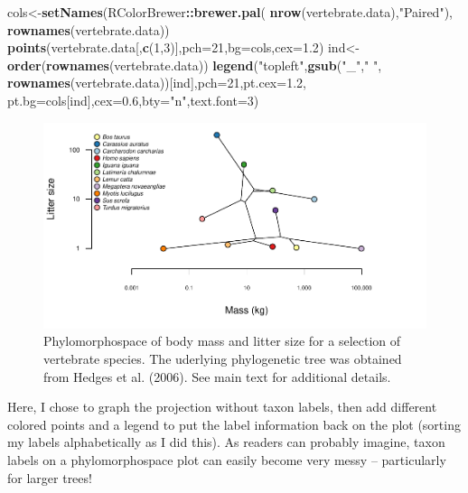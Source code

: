 \documentclass[fleqn,10pt,lineno]{wlpeerj} %
\newenvironment{Shaded}{\begin{snugshade}}{\end{snugshade}}
\newcommand{\AttributeTok}[1]{\textcolor[rgb]{0.13,0.29,0.53}{#1}}
\newcommand{\DecValTok}[1]{\textcolor[rgb]{0.00,0.00,0.81}{#1}}
\newcommand{\FloatTok}[1]{\textcolor[rgb]{0.00,0.00,0.81}{#1}}
\newcommand{\FunctionTok}[1]{\textcolor[rgb]{0.13,0.29,0.53}{\textbf{#1}}}
\newcommand{\NormalTok}[1]{#1}
\newcommand{\OtherTok}[1]{\textcolor[rgb]{0.56,0.35,0.01}{#1}}
\newcommand{\SpecialCharTok}[1]{\textcolor[rgb]{0.81,0.36,0.00}{\textbf{#1}}}
\newcommand{\StringTok}[1]{\textcolor[rgb]{0.31,0.60,0.02}{#1}}
\begin{document}
\begin{Shaded}
\begin{Highlighting}[]
\NormalTok{cols}\OtherTok{\textless{}{-}}\FunctionTok{setNames}\NormalTok{(RColorBrewer}\SpecialCharTok{::}\FunctionTok{brewer.pal}\NormalTok{(}
  \FunctionTok{nrow}\NormalTok{(vertebrate.data),}\StringTok{"Paired"}\NormalTok{),}
  \FunctionTok{rownames}\NormalTok{(vertebrate.data))}
\FunctionTok{points}\NormalTok{(vertebrate.data[,}\FunctionTok{c}\NormalTok{(}\DecValTok{1}\NormalTok{,}\DecValTok{3}\NormalTok{)],}\AttributeTok{pch=}\DecValTok{21}\NormalTok{,}\AttributeTok{bg=}\NormalTok{cols,}\AttributeTok{cex=}\FloatTok{1.2}\NormalTok{)}
\NormalTok{ind}\OtherTok{\textless{}{-}}\FunctionTok{order}\NormalTok{(}\FunctionTok{rownames}\NormalTok{(vertebrate.data))}
\FunctionTok{legend}\NormalTok{(}\StringTok{"topleft"}\NormalTok{,}\FunctionTok{gsub}\NormalTok{(}\StringTok{"\_"}\NormalTok{,}\StringTok{" "}\NormalTok{,}
  \FunctionTok{rownames}\NormalTok{(vertebrate.data))[ind],}\AttributeTok{pch=}\DecValTok{21}\NormalTok{,}\AttributeTok{pt.cex=}\FloatTok{1.2}\NormalTok{,}
  \AttributeTok{pt.bg=}\NormalTok{cols[ind],}\AttributeTok{cex=}\FloatTok{0.6}\NormalTok{,}\AttributeTok{bty=}\StringTok{"n"}\NormalTok{,}\AttributeTok{text.font=}\DecValTok{3}\NormalTok{)}
\end{Highlighting}
\end{Shaded}

\begin{figure}
\includegraphics[width=1\linewidth]{Revell.phytools-v2_peerj_files/figure-latex/vert-phylomorphospace-1} \caption{Phylomorphospace of body mass and litter size for a selection of vertebrate species. The uderlying phylogenetic tree was obtained from Hedges et al. (2006). See main text for additional details.}\label{fig:vert-phylomorphospace}
\end{figure}

Here, I chose to graph the projection without taxon labels, then add different colored points and a legend to put the label information back on the plot (sorting my labels alphabetically as I did this). As readers can probably imagine, taxon labels on a phylomorphospace plot can easily become very messy -- particularly for larger trees!
\end{document}
